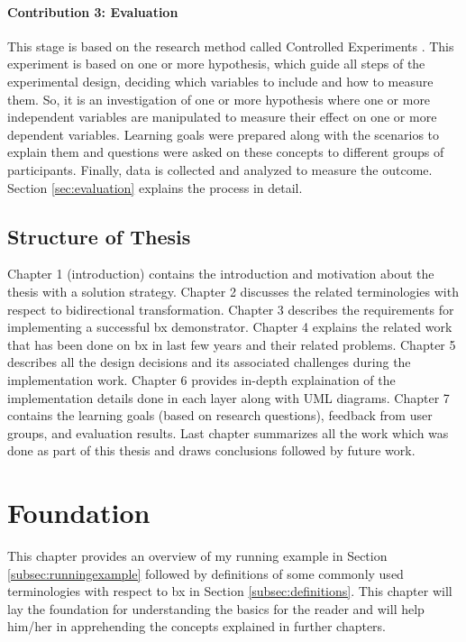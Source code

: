 \paragraph{Contribution 3: Evaluation} 
This stage is based on the research method called Controlled Experiments \cite{semethods}. This experiment is based on one or more hypothesis, which guide all steps of the experimental design, deciding which variables to include and how to measure them. So, it is an investigation of one or more hypothesis where one or more independent variables are manipulated to measure their effect on one or more dependent variables. Learning goals were prepared along with the scenarios to explain them and questions were asked on these concepts to different groups of participants. Finally, data is collected and analyzed to measure the outcome. Section \ref{sec:evaluation} explains the process in detail.

\subsection{Structure of Thesis}\label{subsec:structure}

Chapter 1 (introduction) contains the introduction and motivation about the thesis with a solution strategy. Chapter 2 discusses the related terminologies with respect to bidirectional transformation. Chapter 3 describes the requirements for implementing a successful bx demonstrator. Chapter 4 explains the related work that has been done on bx in last few years and their related problems. Chapter 5 describes all the design decisions and its associated challenges during the implementation work. Chapter 6 provides in-depth explaination of the implementation details done in each layer along with UML diagrams. Chapter 7 contains the learning goals (based on research questions), feedback from user groups, and evaluation results. Last chapter summarizes all the work which was done as part of this thesis and draws conclusions followed by future work.

\clearpage
\section{Foundation}\label{sec:foundation}
This chapter provides an overview of my running example in Section \ref{subsec:runningexample} followed by definitions of some commonly used terminologies with respect to bx in Section \ref{subsec:definitions}. This chapter will lay the foundation for understanding the basics for the reader and will help him/her in apprehending the concepts explained in further chapters.

